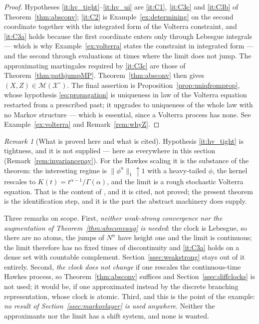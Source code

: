 \documentclass[11pt,a4paper]{article}
\theoremstyle{plain}
\theoremstyle{definition}
\theoremstyle{remark}
\newtheorem{remark}[theorem]{Remark}
\newcommand{\XX}{\mathcal{X}}                  %
\newcommand{\Msol}{\mathcal{M}}
\newcommand{\JR}{\cite{JR16}}
\begin{document}
\begin{proof}
  Hypotheses \ref{it:hv_tight}--\ref{it:hv_ui} are \ref{it:C1}, \ref{it:C3c} and
  \ref{it:C3b} of Theorem~\ref{thm:absconv}; \ref{it:C2} is
  Example~\ref{ex:determining} on the second coordinate together with the
  integrated form of the Volterra constraint, and \ref{it:C3a} holds because the
  first coordinate enters only through Lebesgue integrals --- which is why
  Example~\ref{ex:volterra} states the constraint in integrated form --- and the
  second through evaluations at times where the limit does not jump.  The
  approximating martingales required by \ref{it:C3c} are those of
  Theorem~\ref{thm:pathjumpMP}.  Theorem~\ref{thm:absconv} then gives
  $(X,Z) \in \Msol(\XX^\circ)$.  The final assertion is
  Proposition~\ref{prop:uniqfromprop}, whose hypothesis \eqref{eq:propagation} is
  uniqueness in law of the Volterra equation restarted from a prescribed past;
  it upgrades to uniqueness of the whole law with no Markov structure --- which is
  essential, since a Volterra process has none.  See Example~\ref{ex:volterra}
  and Remark~\ref{rem:whyZ}.
\end{proof}

\begin{remark}[What is proved here and what is cited]
  \label{rem:hawkescaveat}
  Hypothesis \ref{it:hv_tight} is tightness, and it is not supplied --- here as
  everywhere in this section (Remark~\ref{rem:invariancepay}).  For the Hawkes
  scaling it is the substance of the theorem: the interesting regime is
  $\lVert\phi^n\rVert_1 \uparrow 1$ with a heavy-tailed $\phi$, the kernel rescales
  to $K(t) = t^{\alpha-1}/\Gamma(\alpha)$, and the limit is a rough stochastic
  Volterra equation.  That is the content of \JR, and it is cited, not proved; the
  present theorem is the identification step, and it is the part the abstract
  machinery does supply.

  Three remarks on scope.  First, \emph{neither weak-strong convergence nor the
  augmentation of Theorem~\ref{thm:absconvaug} is needed}: the clock is Lebesgue,
  so there are no atoms, the jumps of $N^n$ have height one and the limit is
  continuous; the limit therefore has no fixed times of discontinuity and
  \ref{it:C3a} holds on a dense set with countable complement.
  Section~\ref{ssec:weakstrong} stays out of it entirely.  Second,
  \emph{the clock does not change} if one rescales the continuous-time Hawkes
  process, so Theorem~\ref{thm:absconv} suffices and
  Section~\ref{ssec:diffclocks} is not used; it would be, if one approximated
  instead by the discrete branching representation, whose clock is atomic.
  Third, and this is the point of the example: \emph{no result of
  Section~\ref{ssec:markovlayer} is used anywhere}.  Neither the approximants nor
  the limit has a shift system, and none is wanted.
\end{remark}
\end{document}
